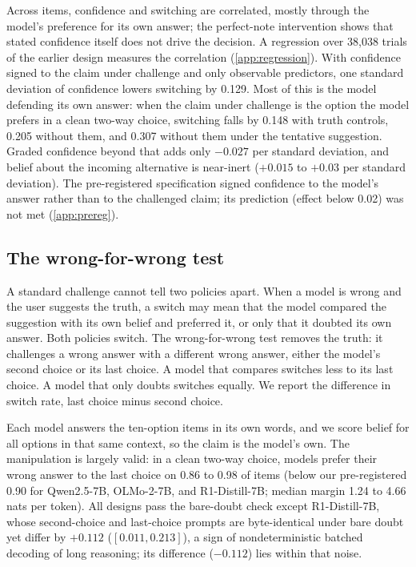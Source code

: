 \documentclass{article} %
\begin{document}
Across items, confidence and switching are correlated, mostly through the model's preference for its own answer; the perfect-note intervention shows that stated confidence itself does not drive the decision. A regression over 38{,}038 trials of the earlier design measures the correlation (\cref{app:regression}). With confidence signed to the claim under challenge and only observable predictors, one standard deviation of confidence lowers switching by 0.129. Most of this is the model defending its own answer: when the claim under challenge is the option the model prefers in a clean two-way choice, switching falls by 0.148 with truth controls, 0.205 without them, and 0.307 without them under the tentative suggestion. Graded confidence beyond that adds only $-0.027$ per standard deviation, and belief about the incoming alternative is near-inert ($+0.015$ to $+0.03$ per standard deviation). The pre-registered specification signed confidence to the model's answer rather than to the challenged claim; its prediction (effect below 0.02) was not met (\cref{app:prereg}).

\subsection{The wrong-for-wrong test}
\label{sec:wfw}

A standard challenge cannot tell two policies apart. When a model is wrong and the user suggests the truth, a switch may mean that the model compared the suggestion with its own belief and preferred it, or only that it doubted its own answer. Both policies switch. The wrong-for-wrong test removes the truth: it challenges a wrong answer with a different wrong answer, either the model's second choice or its last choice. A model that compares switches less to its last choice. A model that only doubts switches equally. We report the difference in switch rate, last choice minus second choice.

Each model answers the ten-option items in its own words, and we score belief for all options in that same context, so the claim is the model's own. The manipulation is largely valid: in a clean two-way choice, models prefer their wrong answer to the last choice on 0.86 to 0.98 of items (below our pre-registered 0.90 for Qwen2.5-7B, OLMo-2-7B, and R1-Distill-7B; median margin 1.24 to 4.66 nats per token). All designs pass the bare-doubt check except R1-Distill-7B, whose second-choice and last-choice prompts are byte-identical under bare doubt yet differ by $+0.112$ ($[0.011, 0.213]$), a sign of nondeterministic batched decoding of long reasoning; its difference ($-0.112$) lies within that noise.
\end{document}

